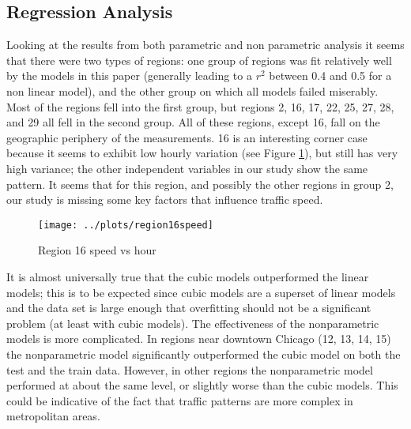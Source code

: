 \documentclass[12pt]{article}
\begin{document}
\subsection{Regression Analysis}
Looking at the results from both parametric and non parametric analysis it seems that there were two types of regions: one group of regions was fit relatively well by the models in this paper (generally leading to a $r^2$ between 0.4 and 0.5 for a non linear model), and the other group on which all models failed miserably. Most of the regions fell into the first group, but regions 2, 16, 17, 22, 25, 27, 28, and 29 all fell in the second group. All of these regions, except 16, fall on the geographic periphery of the measurements. 16 is an interesting corner case because it seems to exhibit low hourly variation (see Figure \ref{region16speed}), but still has very high variance; the other independent variables in our study show the same pattern. It seems that for this region, and possibly the other regions in group 2, our study is missing some key factors that influence traffic speed.
\begin{figure}[!ht]
\centering
\texttt{[image: ../plots/region16speed]}
\caption{Region 16 speed vs hour}
\label{region16speed}
\end{figure}

It is almost universally true that the cubic models outperformed the linear models; this is to be expected since cubic models are a superset of linear models and the data set is large enough that overfitting should not be a significant problem (at least with cubic models). The effectiveness of the nonparametric models is more complicated. In regions near downtown Chicago (12, 13, 14, 15) the nonparametric model significantly outperformed the cubic model on both the test and the train data. However, in other regions the nonparametric model performed at about the same level, or slightly worse than the cubic models. This could be indicative of the fact that traffic patterns are more complex in metropolitan areas.
\end{document}
